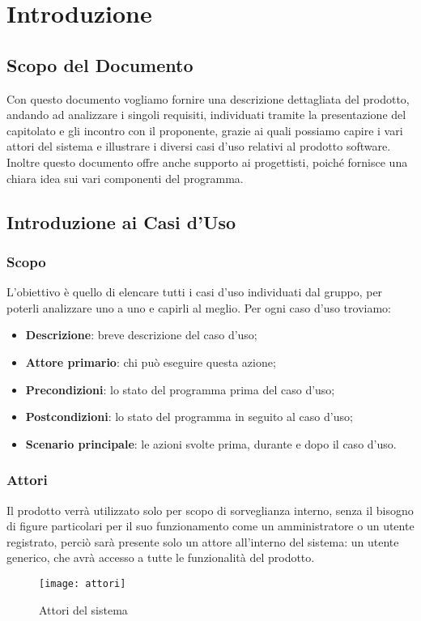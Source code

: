 \chapter{Introduzione}

\section{Scopo del Documento}
Con questo documento vogliamo fornire una descrizione dettagliata del prodotto, andando ad analizzare i singoli
requisiti, individuati tramite la presentazione del capitolato e gli incontro con il proponente, grazie ai quali
possiamo capire i vari attori del sistema e illustrare i diversi casi d'uso relativi al prodotto software.
\newline
Inoltre questo documento offre anche supporto ai progettisti, poiché fornisce una chiara idea sui vari componenti del programma.

\section{Introduzione ai Casi d'Uso}
\subsection{Scopo}
L'obiettivo è quello di elencare tutti i casi d'uso individuati dal gruppo, per poterli analizzare uno a uno e capirli al meglio.
\newline
Per ogni caso d'uso troviamo:
\begin{itemize}
  \item \textbf{Descrizione}: breve descrizione del caso d'uso;
  \item \textbf{Attore primario}: chi può eseguire questa azione;
  \item \textbf{Precondizioni}: lo stato del programma prima del caso d'uso;
  \item \textbf{Postcondizioni}: lo stato del programma in seguito al caso d'uso;
  \item \textbf{Scenario principale}: le azioni svolte prima, durante e dopo il caso d'uso.
\end{itemize}

\subsection{Attori}
Il prodotto verrà utilizzato solo per scopo di sorveglianza interno, senza il bisogno di figure particolari per il suo funzionamento
come un amministratore o un utente registrato, perciò sarà presente solo un attore all'interno del sistema: un utente generico, che avrà accesso a tutte
le funzionalità del prodotto. 
\begin{figure}[h]
  \centering
  \texttt{[image: attori]}
  \caption{Attori del sistema}
\end{figure}

